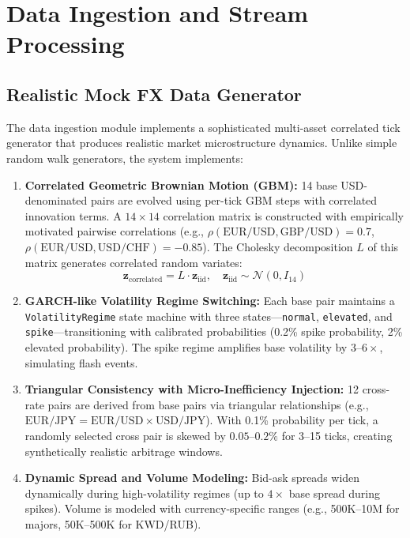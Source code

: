\documentclass[letterpaper,11pt]{report}
\begin{document}
\chapter{Data Ingestion and Stream Processing}

\section{Realistic Mock FX Data Generator}

The data ingestion module implements a sophisticated multi-asset correlated tick generator that produces realistic market microstructure dynamics. Unlike simple random walk generators, the system implements:

\begin{enumerate}
    \item \textbf{Correlated Geometric Brownian Motion (GBM):} 14 base USD-denominated pairs are evolved using per-tick GBM steps with correlated innovation terms. A $14 \times 14$ correlation matrix is constructed with empirically motivated pairwise correlations (e.g., $\rho(\text{EUR/USD}, \text{GBP/USD}) = 0.7$, $\rho(\text{EUR/USD}, \text{USD/CHF}) = -0.85$). The Cholesky decomposition $L$ of this matrix generates correlated random variates:
    $$\mathbf{z}_{\text{correlated}} = L \cdot \mathbf{z}_{\text{iid}}, \quad \mathbf{z}_{\text{iid}} \sim \mathcal{N}(0, I_{14})$$

    \item \textbf{GARCH-like Volatility Regime Switching:} Each base pair maintains a \texttt{VolatilityRegime} state machine with three states---\texttt{normal}, \texttt{elevated}, and \texttt{spike}---transitioning with calibrated probabilities (0.2\% spike probability, 2\% elevated probability). The spike regime amplifies base volatility by $3\text{--}6\times$, simulating flash events.

    \item \textbf{Triangular Consistency with Micro-Inefficiency Injection:} 12 cross-rate pairs are derived from base pairs via triangular relationships (e.g., $\text{EUR/JPY} = \text{EUR/USD} \times \text{USD/JPY}$). With 0.1\% probability per tick, a randomly selected cross pair is skewed by $0.05\text{--}0.2\%$ for 3--15 ticks, creating synthetically realistic arbitrage windows.

    \item \textbf{Dynamic Spread and Volume Modeling:} Bid-ask spreads widen dynamically during high-volatility regimes (up to $4\times$ base spread during spikes). Volume is modeled with currency-specific ranges (e.g., 500K--10M for majors, 50K--500K for KWD/RUB).
\end{enumerate}
\end{document}
